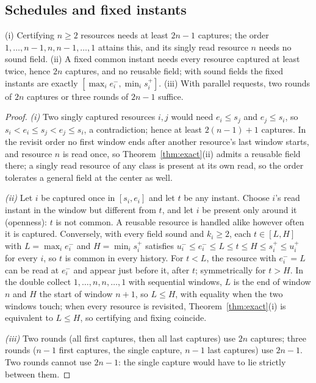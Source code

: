 \subsection{Schedules and fixed instants}
\begin{corollary}[Schedules]\label{cor:schedule}
\textup{(i)} Certifying $n\ge2$ resources needs at least $2n-1$ captures; the
order $1,\dots,n-1,n,n-1,\dots,1$ attains this, and its singly read resource $n$
needs no sound field. \textup{(ii)} A fixed common instant needs every resource
captured at least twice, hence $2n$ captures, and no reusable field; with sound
fields the fixed instants are exactly $[\max_ie_i^-,\min_is_i^+]$.
\textup{(iii)} With parallel requests, two rounds of $2n$ captures or three
rounds of $2n-1$ suffice.
\end{corollary}
\begin{proof}
\emph{(i)} Two singly captured resources $i,j$ would need $e_i\le s_j$ and
$e_j\le s_i$, so $s_i<e_i\le s_j<e_j\le s_i$, a contradiction; hence at least
$2(n-1)+1$ captures. In the revisit order no first window ends after another
resource's last window starts, and resource $n$ is read once, so
Theorem~\ref{thm:exact}(ii) admits a reusable field there; a singly read
resource of any class is present at its own read, so the order tolerates a
general field at the center as well.

\emph{(ii)} Let $i$ be captured once in $[s_i,e_i]$ and let $t$ be any instant.
Choose $i$'s read instant in the window but different from $t$, and let $i$ be
present only around it (openness): $t$ is not common. A reusable resource is
handled alike however often it is captured. Conversely, with every field sound
and $k_i\ge2$, each $t\in[L,H]$ with $L=\max_ie_i^-$ and $H=\min_is_i^+$
satisfies $u_i^-\le e_i^-\le L\le t\le H\le s_i^+\le u_i^+$ for every $i$, so $t$
is common in every history. For $t<L$, the resource with $e_i^-=L$ can be read
at $e_i^-$ and appear just before it, after $t$; symmetrically for $t>H$. In the
double collect $1,\dots,n,n,\dots,1$ with sequential windows, $L$ is the end of window $n$ and $H$ the start of window $n+1$, so $L\le H$,
with equality when the two windows touch; when every resource is
revisited, Theorem~\ref{thm:exact}(i) is equivalent to $L\le H$, so certifying
and fixing coincide.

\emph{(iii)} Two rounds (all first captures, then all last captures) use $2n$
captures; three rounds ($n-1$ first captures, the single capture, $n-1$ last
captures) use $2n-1$. Two rounds cannot use $2n-1$: the single capture would
have to lie strictly between them.
\end{proof}

